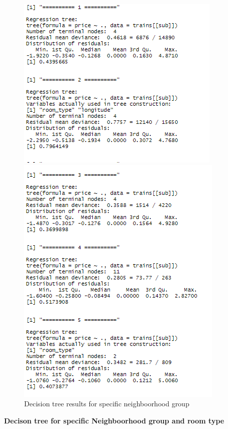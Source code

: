 \documentclass{FR16}
\begin{document}
\begin{figure}[!htb]
   \begin{minipage}{0.48\textwidth}
     \centering
     \includegraphics[width=.7\linewidth]{figures/dt1.1.PNG} 
   \end{minipage}\hfill
   \begin{minipage}{0.48\textwidth}
     \centering
     \includegraphics[width=.7\linewidth]{figures/dt1.2.PNG}
   \end{minipage}
        \caption{ Decision tree results for specific neighboorhood group}\label{fig:11}

\end{figure}

\newpage 
\noindent \textbf{Decison tree  for specific Neighboorhood group and room type}
 
\end{document}

